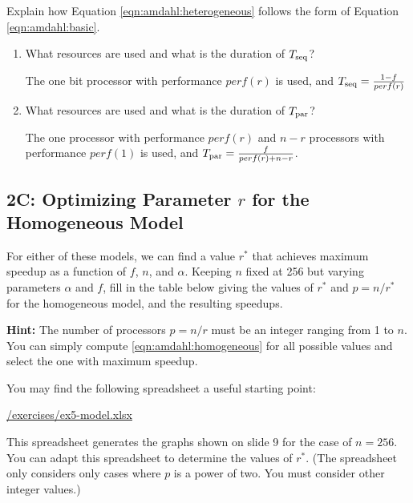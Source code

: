 \documentclass[11pt]{article}
\newcommand{\cref}[2]{\href{#1}{\color{blue}#2}}
\newenvironment{answer}{\begin{minipage}[c][2.0in]{\textwidth}}{\end{minipage}}
\begin{document}
Explain how Equation \ref{eqn:amdahl:heterogeneous} follows the form
of Equation
\ref{eqn:amdahl:basic}.
\begin{enumerate}
\item
What resources are used and what is the duration of $T_{\rm seq}$?

\begin{answer}

The one bit processor with performance $perf(r)$ is used, and $T_{\rm seq}=\frac{1-f}{perf(r)}$

\end{answer}


\item
What resources are used and what is the duration of $T_{\rm par}$?

\begin{answer}

The one processor with performance $perf(r)$ and $n-r$ processors with performance $perf(1)$ is 
used, and $T_{\rm par}=\frac{f}{perf(r)+n-r}$. 

\end{answer}
\end{enumerate}

\newpage

\subsection*{2C: Optimizing Parameter $r$ for the Homogeneous Model}

For either of these models, we can find a value $r^{*}$ that achieves
maximum speedup as a function of $f$, $n$, and $\alpha$.  Keeping $n$
fixed at 256 but varying parameters $\alpha$ and $f$, fill in the
table below giving the values of $r^{*}$ and $p = n/r^{*}$ for the
homogeneous model, and the resulting speedups.

{\bf Hint:} The number of processors $p = n/r$ must be an integer
ranging from 1 to $n$.  You can
simply compute
\ref{eqn:amdahl:homogeneous} for all possible values and select the
one with maximum speedup.

You may find the following spreadsheet a useful starting point:
\begin{center}
\cref{\actualcoursehome/exercises/ex5-model.xlsx}{\visiblecoursehome/exercises/ex5-model.xlsx}
\end{center}
This spreadsheet generates the graphs shown on slide 9 for the case of
$n=256$.  You can adapt this spreadsheet to determine the values of
$r^{*}$.  (The spreadsheet only considers only cases where $p$ is a power of two.
You must consider other integer values.)
\end{document}

